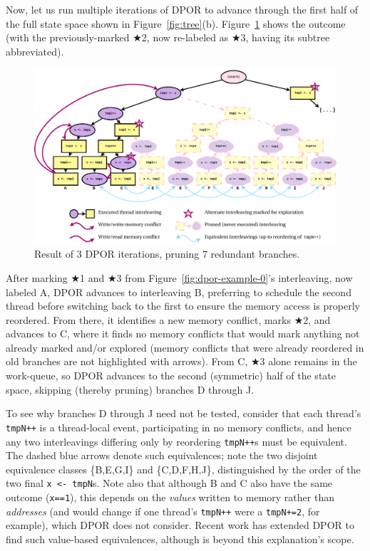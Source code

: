 Now, let us run multiple iterations of DPOR
to advance through the first half of the full state space shown in Figure~\ref{fig:tree}(b).
Figure~\ref{fig:dpor-example-1} shows the outcome
(with the previously-marked $\bigstar$2, now re-labeled as $\bigstar$3, having its subtree abbreviated).

\begin{figure}[h]
	\begin{center}
		\includegraphics[width=\textwidth]{dpor-example-1.pdf}
	\end{center}
	\caption{Result of 3 DPOR iterations, pruning 7 redundant branches.}
	\label{fig:dpor-example-1}
\end{figure}

After marking $\bigstar$1 and $\bigstar$3 from Figure~\ref{fig:dpor-example-0}'s interleaving, now labeled A,
DPOR advances to interleaving B, preferring to schedule the second thread before switching back to the first
to ensure the memory access is properly reordered.
From there, it identifies a new memory conflict, marks $\bigstar$2, and advances to C,
where it finds no memory conflicts that would mark anything not already marked and/or explored
(memory conflicts that were already reordered in old branches are not highlighted with arrows).
From C, $\bigstar$3 alone remains in the work-queue,
so DPOR advances to the second (symmetric) half of the state space,
skipping (thereby pruning) branches D through J.

To see why branches D through J need not be tested, consider that each thread's {\tt tmpN++} is a thread-local event,
participating in no memory conflicts,
and hence any two interleavings differing only by reordering {\tt tmpN++}s must be equivalent.
The dashed blue arrows denote such equivalences;
note the two disjoint equivalence classes \{B,E,G,I\} and \{C,D,F,H,J\},
distinguished by the order of the two final {\tt x <- tmpN}s.
Note also that
although B and C also have the same outcome ({\tt x==1}),
this depends on the {\em values} written to memory rather than {\em addresses}
(and would change if one thread's {\tt tmpN++} were a {\tt tmpN+=2}, for example),
which DPOR does not consider.
Recent work \cite{mcr} has extended DPOR to find such value-based equivalences,
although is beyond this explanation's scope.

